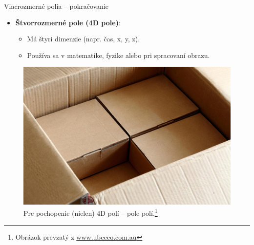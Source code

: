 \documentclass[xcolor=dvipsnames]{beamer}
\begin{document}
\begin{frame}{Viacrozmerné polia -- pokračovanie}
\begin{itemize}
        \item \textbf{Štvorrozmerné pole (4D pole)}:
        \begin{itemize}
            \item Má štyri dimenzie (napr. čas, x, y, z).
            \item Používa sa v matematike, fyzike alebo pri spracovaní obrazu.
        \end{itemize}
    \end{itemize}
    \begin{figure}
        \centering
        \includegraphics[width=0.5\linewidth]{latexprez.jpg}
        \caption{Pre pochopenie (nielen) 4D polí -- pole polí.\footnote{Obrázok prevzatý z \href{https://www.ubeeco.com.au/news/2017/02/12/custom-made-boxes-avoid-set-up-charges/}{www.ubeeco.com.au}}}
        \label{fig:4D_array_example}
    \end{figure}
\end{frame}
\end{document}
